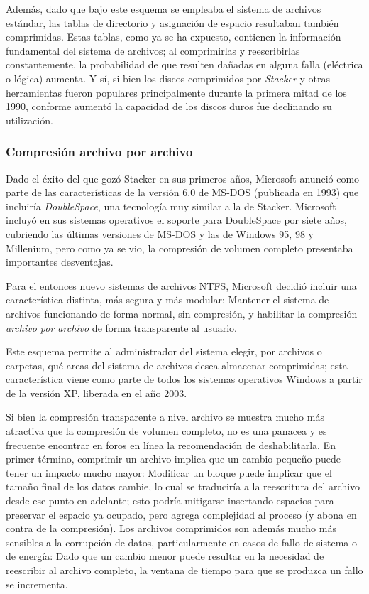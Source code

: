 \documentclass[11pt,fleqn]{book} %
\begin{document}
Además, dado que bajo este esquema se empleaba el sistema de archivos
estándar, las tablas de directorio y asignación de espacio resultaban
también comprimidas. Estas tablas, como ya se ha expuesto,
contienen la información fundamental del sistema de
archivos; al comprimirlas y reescribirlas constantemente, la
probabilidad de que resulten dañadas en alguna falla (eléctrica o
lógica) aumenta. Y sí, si bien los discos comprimidos por \emph{Stacker} y
otras herramientas fueron populares principalmente durante la primera
mitad de los 1990, conforme aumentó la capacidad de los discos duros
fue declinando su utilización.
\subsubsection{Compresión archivo por archivo}
\label{sec-7-1-5-2}


Dado el éxito del que gozó Stacker en sus primeros años, Microsoft
anunció como parte de las características de la versión 6.0 de MS-DOS
(publicada en 1993) que incluiría \emph{DoubleSpace}, una tecnología muy
similar a la de Stacker. Microsoft incluyó en sus sistemas operativos
el soporte para DoubleSpace
por siete años, cubriendo las últimas versiones de MS-DOS y las de
Windows 95, 98 y Millenium, pero como ya se vio, la compresión de
volumen completo presentaba importantes desventajas.

Para el entonces nuevo sistemas de archivos NTFS, Microsoft decidió
incluir una característica distinta, más segura y más modular:
Mantener el sistema de archivos funcionando de forma normal, sin
compresión, y habilitar la compresión \emph{archivo por archivo} de forma
transparente al usuario.

Este esquema permite al administrador del sistema elegir, por archivos
o carpetas, qué areas del sistema de archivos desea almacenar
comprimidas; esta característica viene como parte de todos los
sistemas operativos Windows a partir de la versión XP, liberada en el
año 2003.

Si bien la compresión transparente a nivel archivo se muestra mucho
más atractiva que la compresión de volumen completo, no es una panacea
y es frecuente encontrar en foros en línea la recomendación de
deshabilitarla. En primer término, comprimir un archivo implica que
un cambio pequeño puede tener un impacto mucho mayor: Modificar un
bloque puede implicar que el tamaño final de los datos cambie, lo cual
se traduciría a la reescritura del archivo desde ese punto en
adelante; esto podría mitigarse insertando espacios para preservar el
espacio ya ocupado, pero agrega complejidad al proceso (y abona en
contra de la compresión). Los archivos comprimidos son además mucho
más sensibles a la corrupción de datos, particularmente en casos de
fallo de sistema o de energía: Dado que un cambio menor puede resultar
en la necesidad de reescribir al archivo completo, la ventana de
tiempo para que se produzca un fallo se incrementa.
\end{document}

